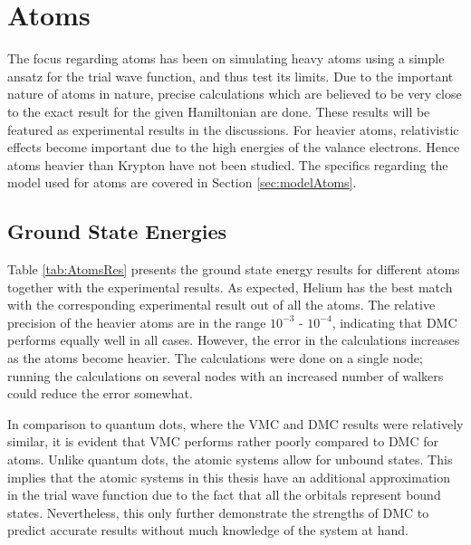 \section{Atoms}
 
 The focus regarding atoms has been on simulating heavy atoms using a simple ansatz for the trial wave function, and thus test its limits. Due to the important nature of atoms in nature, precise calculations which are believed to be very close to the exact result for the given Hamiltonian are done. These results will be featured as experimental results in the discussions. For heavier atoms, relativistic effects become important due to the high energies of the valance electrons. Hence atoms heavier than Krypton have not been studied. The specifics regarding the model used for atoms are covered in Section \ref{sec:modelAtoms}.
 
\subsection{Ground State Energies}
 
 Table \ref{tab:AtomsRes} presents the ground state energy results for different atoms together with the experimental results. As expected, Helium has the best match with the corresponding experimental result out of all the atoms. The relative precision of the heavier atoms are in the range $10^{-3}$ - $10^{-4}$, indicating that DMC performs equally well in all cases. However, the error in the calculations increases as the atoms become heavier. The calculations were done on a single node; running the calculations on several nodes with an increased number of walkers could reduce the error somewhat. 
 
 In comparison to quantum dots, where the VMC and DMC results were relatively similar, it is evident that VMC performs rather poorly compared to DMC for atoms. Unlike quantum dots, the atomic systems allow for unbound states. This implies that the atomic systems in this thesis have an additional approximation in the trial wave function due to the fact that all the orbitals represent bound states. Nevertheless, this only further demonstrate the strengths of DMC to predict accurate results without much knowledge of the system at hand.
 
